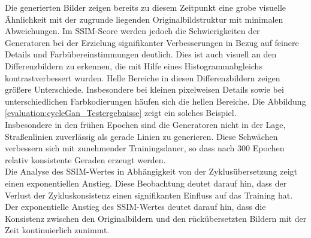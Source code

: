 Die generierten Bilder zeigen bereits zu diesem Zeitpunkt eine grobe visuelle Ähnlichkeit mit der zugrunde liegenden Originalbildstruktur mit minimalen Abweichungen. Im SSIM-Score werden jedoch die Schwierigkeiten der Generatoren bei der Erzielung signifikanter Verbesserungen in Bezug auf feinere Details und Farbübereinstimmungen deutlich. Dies ist auch visuell an den Differenzbildern zu erkennen, die mit Hilfe eines Histogrammabgleichs kontrastverbessert wurden. Helle Bereiche in diesen Differenzbildern zeigen größere Unterschiede. Insbesondere bei kleinen pixelweisen Details sowie bei unterschiedlichen Farbkodierungen häufen sich die hellen Bereiche. Die Abbildung \ref{evaluation:cycleGan_Testergebnisse} zeigt ein solches Beispiel.
\\
Insbesondere in den frühen Epochen sind die Generatoren nicht in der Lage, Straßenlinien zuverlässig als gerade Linien zu generieren. Diese Schwächen verbessern sich mit zunehmender Trainingsdauer, so dass nach 300 Epochen relativ konsistente Geraden erzeugt werden.
\\\newline
Die Analyse des SSIM-Wertes in Abhängigkeit von der Zyklusübersetzung zeigt einen exponentiellen Anstieg. Diese Beobachtung deutet darauf hin, dass der Verlust der Zykluskonsistenz einen signifikanten Einfluss auf das Training hat. Der exponentielle Anstieg des SSIM-Wertes deutet darauf hin, dass die Konsistenz zwischen den Originalbildern und den rückübersetzten Bildern mit der Zeit kontinuierlich zunimmt.

